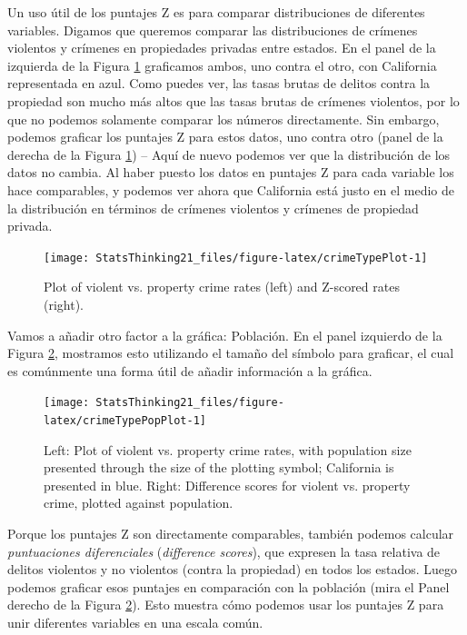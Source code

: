 \documentclass[
  12pt,
]{book}
\begin{document}
Un uso útil de los puntajes Z es para comparar distribuciones de diferentes variables. Digamos que queremos comparar las distribuciones de crímenes violentos y crímenes en propiedades privadas entre estados. En el panel de la izquierda de la Figura \ref{fig:crimeTypePlot} graficamos ambos, uno contra el otro, con California representada en azul. Como puedes ver, las tasas brutas de delitos contra la propiedad son mucho más altos que las tasas brutas de crímenes violentos, por lo que no podemos solamente comparar los números directamente. Sin embargo, podemos graficar los puntajes Z para estos datos, uno contra otro (panel de la derecha de la Figura \ref{fig:crimeTypePlot}) -- Aquí de nuevo podemos ver que la distribución de los datos no cambia. Al haber puesto los datos en puntajes Z para cada variable los hace comparables, y podemos ver ahora que California está justo en el medio de la distribución en términos de crímenes violentos y crímenes de propiedad privada.

\begin{figure}
\texttt{[image: StatsThinking21\_files/figure-latex/crimeTypePlot-1]} \caption{Plot of violent vs. property crime rates (left) and Z-scored rates (right).}\label{fig:crimeTypePlot}
\end{figure}

Vamos a añadir otro factor a la gráfica: Población. En el panel izquierdo de la Figura \ref{fig:crimeTypePopPlot}, mostramos esto utilizando el tamaño del símbolo para graficar, el cual es comúnmente una forma útil de añadir información a la gráfica.

\begin{figure}
\texttt{[image: StatsThinking21\_files/figure-latex/crimeTypePopPlot-1]} \caption{Left: Plot of violent vs. property crime rates, with population size presented through the size of the plotting symbol; California is presented in blue. Right: Difference scores for violent vs. property crime, plotted against population. }\label{fig:crimeTypePopPlot}
\end{figure}

Porque los puntajes Z son directamente comparables, también podemos calcular \emph{puntuaciones diferenciales} (\emph{difference scores}), que expresen la tasa relativa de delitos violentos y no violentos (contra la propiedad) en todos los estados. Luego podemos graficar esos puntajes en comparación con la población (mira el Panel derecho de la Figura \ref{fig:crimeTypePopPlot}). Esto muestra cómo podemos usar los puntajes Z para unir diferentes variables en una escala común.
\end{document}
